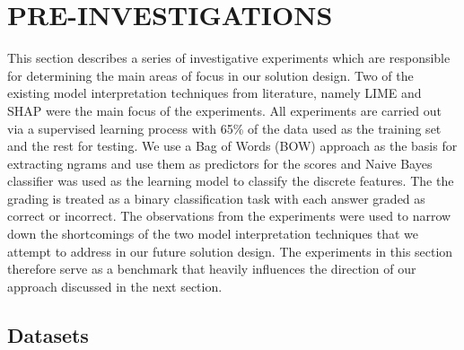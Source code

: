 \documentclass[letterpaper, 10 pt, conference]{ieeeconf}  %
\begin{document}
\section{PRE-INVESTIGATIONS}

This section describes a series of investigative experiments which are responsible for determining the main areas of focus in our solution design. Two of the existing model interpretation techniques from literature, namely LIME and SHAP were the main focus of the experiments. All experiments are carried out via a supervised learning process with 65\% of the data used as the training set and the rest for testing. We use a Bag of Words (BOW) approach as the basis for extracting ngrams and use them as predictors for the scores and Naive Bayes classifier was used as the learning model to classify the discrete features. The the grading is treated as a binary classification task with each answer graded as correct or incorrect. The observations from the experiments were used to narrow down the shortcomings of the two model interpretation techniques that we attempt to address in our future solution design. The experiments in this section therefore serve as a benchmark that heavily influences the direction of our approach discussed in the next section.

\subsection{Datasets} 
\end{document}

